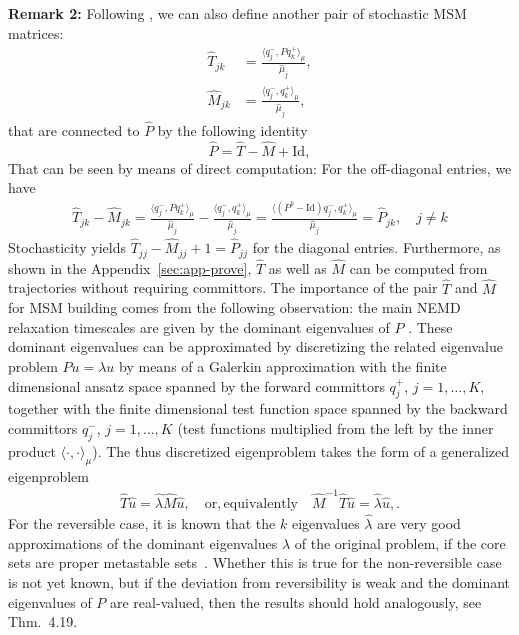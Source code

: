 \documentclass[journal=jctcce,manuscript=article]{achemso}
\newcommand{\fwd}[0]{+}
\newcommand{\bwd}[0]{-}
\newcommand{\id}{\mathrm{Id}}
\begin{document}
\textbf{Remark 2:}
Following \cite{A19-31}, we can also define another pair of stochastic MSM matrices: 
\begin{align}\label{eq:msm-ht-1}
  \hat T_{jk} &= \frac{\langle q_j^\bwd, P q_k^\fwd \rangle_\mu}{\hat \mu_j},\\\label{eq:msm-hm-1}
  \hat M_{jk} &= \frac{\langle q_j^\bwd, q_k^\fwd \rangle_\mu}{\hat \mu_j},
\end{align}
that are connected to $\hat{P}$ by the following identity
\[
\hat{P}=\hat{T}-\hat{M}+\id,
\]
That can be seen by means of direct computation: For the off-diagonal entries, we have
\begin{align}\label{eq:msm-tmp26}
  \hat T_{jk} - \hat M_{jk}
  = \frac{\langle q_j^\bwd, P q_k^\fwd \rangle_\mu}{\hat \mu_j}
  - \frac{\langle q_j^\bwd,  q_k^\fwd \rangle_\mu}{\hat \mu_j}
  = \frac{\langle (P^b - \id) q_j^\bwd, q_k^\fwd \rangle_\mu}{\hat \mu_j}
  = \hat P_{jk}, \quad j\neq k
\end{align}
Stochasticity yields
$\hat T_{jj} - \hat M_{jj} + 1 = \hat P_{jj}$ for the diagonal entries.  Furthermore, as shown in the Appendix~\ref{sec:app-prove}, $\hat{T}$ as well as $\hat{M}$ can be computed from trajectories without requiring committors. 
The importance of the pair $\hat{T}$ and $\hat{M}$ for MSM building comes from the following observation: the main NEMD relaxation timescales are given by the dominant eigenvalues of $P$ \cite{A19-31, A19-1}.
These dominant eigenvalues can be approximated by discretizing the related eigenvalue problem $Pu=\lambda u$ by means of a Galerkin approximation with the finite dimensional ansatz space 
spanned by the forward committors $q^+_j$, $j=1,\ldots,K$, together  with the finite dimensional test function space spanned by the backward committors $q^-_j$, $j=1,\ldots,K$ (test functions multiplied from the left by the inner product $\langle\cdot,\cdot\rangle_\mu$). The thus discretized eigenproblem takes the form  of a generalized eigenproblem
\begin{align}
  \label{eq:msm-gen-ev}
\hat{T}\hat{u}=\hat{\lambda}\hat{M}\hat{u},\quad\mathrm{or, equivalently}\quad \hat{M}^{-1}\hat{T}\hat{u}=\hat{\lambda}\hat{u},.  
\end{align}
For the reversible case, it is known that the $k$ eigenvalues $\hat{\lambda}$ are very good approximations of the dominant eigenvalues $\lambda$ of the original problem, if the core sets are proper metastable sets~\cite{Eigenvalues}. Whether this is true for the non-reversible case is not yet known, but if the deviation from reversibility is weak and the dominant eigenvalues of $P$ are real-valued, then the results should hold analogously, see~\cite{A19-31} Thm.~4.19. 
\end{document}
